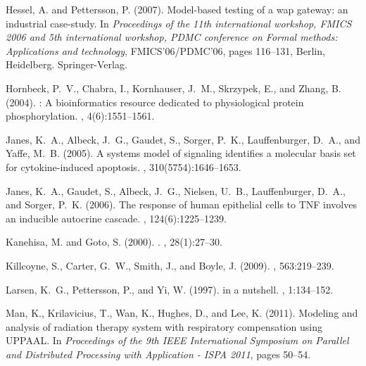 \documentclass{bioinfo}
\begin{document}
\begin{thebibliography}{}
Hessel, A. and Pettersson, P. (2007).
\newblock Model-based testing of a wap gateway: an industrial case-study.
\newblock In {\em Proceedings of the 11th international workshop, FMICS 2006
  and 5th international workshop, PDMC conference on Formal methods:
  Applications and technology}, FMICS'06/PDMC'06, pages 116--131, Berlin,
  Heidelberg. Springer-Verlag.

Hornbeck, P.~V., Chabra, I., Kornhauser, J.~M., Skrzypek, E., and Zhang, B.
  (2004).
: A bioinformatics resource dedicated to physiological
  protein phosphorylation.
, 4(6):1551--1561.

Janes, K.~A., Albeck, J.~G., Gaudet, S., Sorger, P.~K., Lauffenburger, D.~A.,
  and Yaffe, M.~B. (2005).
\newblock A systems model of signaling identifies a molecular basis set for
  cytokine-induced apoptosis.
, 310(5754):1646--1653.

Janes, K.~A., Gaudet, S., Albeck, J.~G., Nielsen, U.~B., Lauffenburger, D.~A.,
  and Sorger, P.~K. (2006).
\newblock The response of human epithelial cells to {TNF} involves an inducible
  autocrine cascade.
, 124(6):1225--1239.

Kanehisa, M. and Goto, S. (2000).
.
, 28(1):27--30.

Killcoyne, S., Carter, G.~W., Smith, J., and Boyle, J. (2009).
, 563:219--239.

Larsen, K.~G., Pettersson, P., and Yi, W. (1997).
 in a nutshell.
, 1:134--152.

Man, K., Krilavicius, T., Wan, K., Hughes, D., and Lee, K. (2011).
\newblock Modeling and analysis of radiation therapy system with respiratory
  compensation using {UPPAAL}.
\newblock In {\em Proceedings of the 9th IEEE International Symposium on
  Parallel and Distributed Processing with Application - {ISPA} 2011}, pages
  50--54.


\end{thebibliography}
\end{document}
